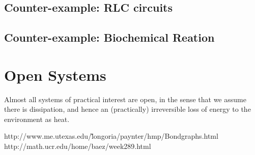 \documentclass[11pt, a4paper]{amsart}
\begin{document}
\subsection{Counter-example: RLC circuits}

\subsection{Counter-example: Biochemical Reation}

\section{Open Systems}
Almost all systems of practical interest are open, in the sense that we assume there is dissipation, and hence an (practically) irreversible loss of energy to the environment as heat. 


\begin{thebibliography}{2}
http://www.me.utexas.edu/\~longoria/paynter/hmp/Bondgraphs.html
 http://math.ucr.edu/home/baez/week289.html
\end{thebibliography}
	
\end{document}
